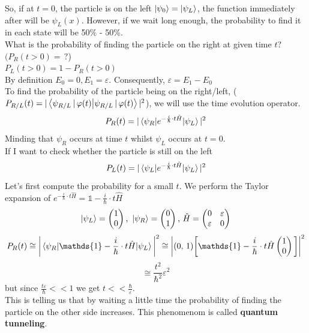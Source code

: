 \newline
So, if at $t=0$, the  particle is on the left $\ket{\psi_0}=\ket{\psi_L}$, the function immediately after will be $\psi_L(x)$. However, if we wait long enough, the probability to find it in each state will be 50\% - 50\%. \\
What is the probability of finding the particle on the right at given time $t$? \\
$(P_R(t>0)=\,?$)\\
$P_L(t>0)=1-P_R(t>0)$\\
By definition $E_0=0, E_1= \varepsilon$. Consequently, $\varepsilon = E_1-E_0$\\
To find the probability of the particle being on the right/left, ($P_{R/L}(t)=|\braket{\psi_{R/L}\,|\,\varphi(t)}|^2$), we will use the time evolution operator.\\
\[
P_R(t)=|\mel{\psi_R}{e^{-\frac{i}{\hbar}\cdot t \hat{H}}}{\psi_L}|^2
\]
Minding that $\psi_R$ occurs at time $t$ whilst $\psi_L$ occurs at $t=0$.\\
If I want to check whether the particle is still on the left
\[
P_L(t)=|\mel{\psi_L}{e^{-\frac{i}{\hbar}\cdot t \hat{H}}}{\psi_L}|^2
\]
Let's first compute the probability for a small $t$. We perform the Taylor expansion of $e^{-\frac{i}{\hbar}\cdot t \hat{H}} = \mathds{1} -\frac{i}{\hbar}\cdot t\hat{H}$
\[
\ket{\psi_L}=\begin{pmatrix}
1\\0
\end{pmatrix}
\text{, }
\ket{\psi_R}=
\begin{pmatrix}
0\\1
\end{pmatrix}
\text{, }
\hat{H}=
\begin{pmatrix}
0 & \varepsilon\\ \varepsilon & 0
\end{pmatrix}
\]
\[
P_R(t)\cong\bigg|\mel{\psi_R}{\mathds{1}-\frac{i}{\hbar}\cdot t \hat{H}}{\psi_L}\bigg|^2 \cong
\bigg|(0,\,1) \bigg[\mathds{1}-\frac{i}{\hbar}\cdot t\hat{H}
\begin{pmatrix}1\\0\end{pmatrix}\bigg]\bigg|^2
\]
\[
\cong \frac{t^2}{\hbar^2}\varepsilon^2
\]
but since $\frac{t\varepsilon}{\hbar}<<1$ we get $t << \frac{\hbar}{\varepsilon}$.\\
This is telling us that by waiting a little time the probability of finding the particle on the other side increases. This phenomenom is called \textbf{quantum tunneling}.\\
